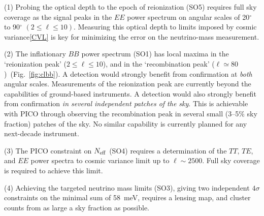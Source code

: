 \documentclass[PICOReport.tex]{subfiles}
\begin{document}
(1) Probing the optical depth to the epoch of reionization (SO5) requires full sky coverage as the signal peaks in the $EE$ power spectrum on angular scales of 20$^\circ$ to 90$^\circ$ $(2 \leq \ell \leq 10)$. Measuring this optical depth to limits imposed by cosmic variance\cref{CVL} is key for minimizing the error on the neutrino-mass measurement. 

(2) The inflationary $BB$ power spectrum (SO1) has local maxima in the `reionization peak' ($ 2 \leq \ell \leq 10$), and in the `recombination peak' ($ \ell \simeq 80$)~(Fig.~\ref{fig:clbb}). A detection would strongly benefit from confirmation at {\it both} angular scales. Measurements of the reionization peak are currently beyond the capabilities of ground-based instruments. A detection would also strongly benefit from confirmation  {\it in several independent patches of the sky}. This is achievable with PICO through observing the recombination peak in several small (3--5\% sky fraction) patches of the sky. No similar capability is currently planned for any next-decade instrument.  

(3) The PICO constraint on $N_{\rm eff}$ (SO4) requires a determination of the $TT,\, TE$, and $EE$ power spectra to cosmic variance limit up to $\ell\sim2500$. Full sky coverage is required to achieve this limit.  

(4) Achieving the targeted neutrino mass limits (SO3), giving two independent $4\sigma$ constraints on the minimal sum of 58~meV, requires a lensing map, and cluster counts from as large a sky fraction as possible. 
\end{document}
